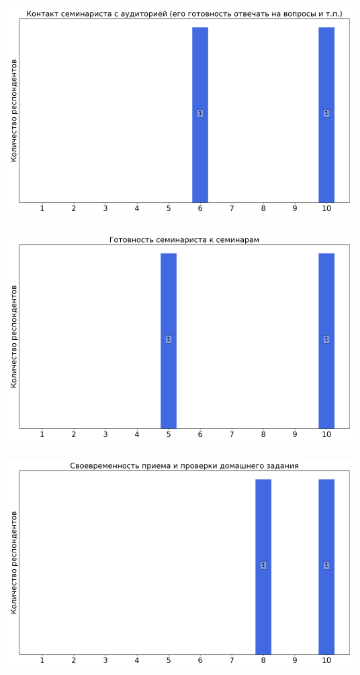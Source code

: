		\begin{figure}[H]
			\centering
			\begin{subfigure}[b]{0.45\textwidth}
				\centering
				\includegraphics[width=\textwidth]{images/2 course/Компьютерные технологии/seminarists-marks-Гутник С.А.-0.png}
			\end{subfigure}
			\begin{subfigure}[b]{0.45\textwidth}
				\centering
				\includegraphics[width=\textwidth]{images/2 course/Компьютерные технологии/seminarists-marks-Гутник С.А.-1.png}
			\end{subfigure}
			\begin{subfigure}[b]{0.45\textwidth}
				\centering
				\includegraphics[width=\textwidth]{images/2 course/Компьютерные технологии/seminarists-marks-Гутник С.А.-2.png}

\end{subfigure}
\end{figure}
